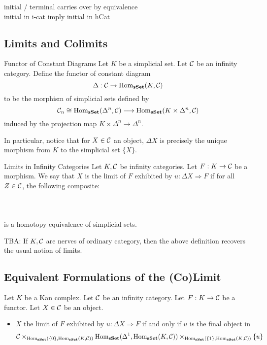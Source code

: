 \documentclass[a4paper]{article}
\begin{document}
initial / terminal carries over by equivalence\\

initial in i-cat imply initial in hCat

\subsection{Limits and Colimits}
\begin{defn}{Functor of Constant Diagrams}{} Let $K$ be a simplicial set. Let $\mathcal{C}$ be an infinity category. Define the functor of constant diagram $$\Delta:\mathcal{C}\to\operatorname{Hom}_\bold{sSet}(K,\mathcal{C})$$ to be the morphism of simplicial sets defined by $$\mathcal{C}_n\cong\operatorname{Hom}_\bold{sSet}(\Delta^n,\mathcal{C})\longrightarrow\operatorname{Hom}_\bold{sSet}(K\times\Delta^n,\mathcal{C})$$ induced by the projection map $K\times\Delta^n\to\Delta^n$. 
\end{defn}

In particular, notice that for $X\in\mathcal{C}$ an object, $\Delta X$ is precisely the unique morphism from $K$ to the simplicial set $\{X\}$. 

\begin{defn}{Limits in Infinity Categories}{} Let $K,\mathcal{C}$ be infinity categories. Let $F:K\to\mathcal{C}$ be a morphism. We say that $X$ is the limit of $F$ exhibited by $u:\Delta X\Rightarrow F$ if for all $Z\in\mathcal{C}$, the following composite: \\~\\
\\~\\
is a homotopy equivalence of simplicial sets. 
\end{defn}

TBA: If $K,\mathcal{C}$ are nerves of ordinary category, then the above definition recovers the usual notion of limits. 

\subsection{Equivalent Formulations of the (Co)Limit}
\begin{prp}{}{} Let $K$ be a Kan complex. Let $\mathcal{C}$ be an infinity category. Let $F:K\to\mathcal{C}$ be a functor. Let $X\in\mathcal{C}$ be an object. 
\begin{itemize}
\item $X$ the limit of $F$ exhibited by $u:\Delta X\Rightarrow F$ if and only if $u$ is the final object in $$\mathcal{C}\times_{\operatorname{Hom}_\bold{sSet}(\{0\},\operatorname{Hom}_\bold{sSet}(K,\mathcal{C}))}\operatorname{Hom}_\bold{sSet}(\Delta^1,\operatorname{Hom}_\bold{sSet}(K,\mathcal{C}))\times_{\operatorname{Hom}_\bold{sSet}(\{1\},\operatorname{Hom}_\bold{sSet}(K,\mathcal{C}))}\{u\}$$
\end{itemize}
\end{prp}
\end{document}
